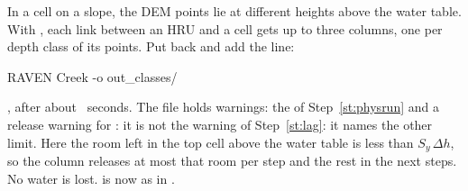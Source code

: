 In a cell on a slope, the DEM points lie at different heights above the water table. With
, each link between an HRU and a cell gets up to three columns, one per depth class of its
points. Put  back and add the line:
\begin{shell}
$ $RAVEN Creek -o out_classes/
\end{shell}
\see {}, after about ~seconds. The file
 holds  warnings: the  of
Step~\ref{st:physrun} and a release warning for :
\why it is not the warning of Step~\ref{st:lag}: it names the other limit. Here the room left in the top cell above the
water table is less than $S_y\,\Delta h$, so the column releases at most that room per step and the rest in the next
steps. No water is lost.  is now as in .

